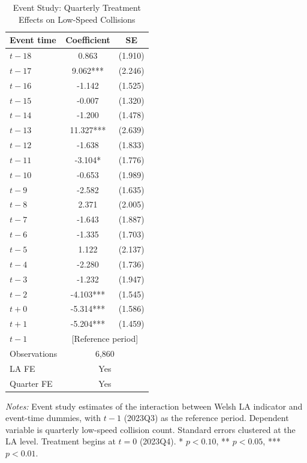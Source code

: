 \begin{table}[H]
\centering
\caption{Event Study: Quarterly Treatment Effects on Low-Speed Collisions}
\label{tab:eventstudy}
\begin{threeparttable}
\begin{tabular}{l cc}
\toprule
Event time & Coefficient & SE \\
\midrule
$t  - 18$ & 0.863 & (1.910) \\
$t  - 17$ & 9.062*** & (2.246) \\
$t  - 16$ & -1.142 & (1.525) \\
$t  - 15$ & -0.007 & (1.320) \\
$t  - 14$ & -1.200 & (1.478) \\
$t  - 13$ & 11.327*** & (2.639) \\
$t  - 12$ & -1.638 & (1.833) \\
$t  - 11$ & -3.104* & (1.776) \\
$t  - 10$ & -0.653 & (1.989) \\
$t  - 9$ & -2.582 & (1.635) \\
$t  - 8$ & 2.371 & (2.005) \\
$t  - 7$ & -1.643 & (1.887) \\
$t  - 6$ & -1.335 & (1.703) \\
$t  - 5$ & 1.122 & (2.137) \\
$t  - 4$ & -2.280 & (1.736) \\
$t  - 3$ & -1.232 & (1.947) \\
$t  - 2$ & -4.103*** & (1.545) \\
$t + 0$ & -5.314*** & (1.586) \\
$t + 1$ & -5.204*** & (1.459) \\
$t - 1$ & \multicolumn{2}{c}{[Reference period]} \\
\midrule
Observations & \multicolumn{2}{c}{6,860} \\
LA FE & \multicolumn{2}{c}{Yes} \\
Quarter FE & \multicolumn{2}{c}{Yes} \\
\bottomrule
\end{tabular}
\begin{tablenotes}[flushleft]
\small
\item \textit{Notes:} Event study estimates of the interaction between Welsh LA indicator and event-time dummies, with $t-1$ (2023Q3) as the reference period. Dependent variable is quarterly low-speed collision count. Standard errors clustered at the LA level. Treatment begins at $t=0$ (2023Q4). * $p<0.10$, ** $p<0.05$, *** $p<0.01$.
\end{tablenotes}
\end{threeparttable}
\end{table}

